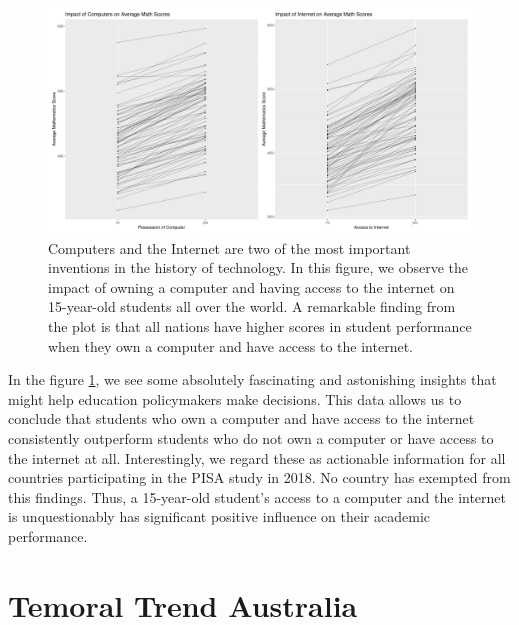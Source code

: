 \begin{Schunk}
\begin{figure}[H]
\includegraphics[width=1\linewidth]{learningtower_files/figure-latex/compint-plot-1} \caption[Computers and the Internet are two of the most important inventions in the history of technology]{Computers and the Internet are two of the most important inventions in the history of technology. In this figure, we observe the impact of owning a computer and having access to the internet on 15-year-old students all over the world. A remarkable finding from the plot is that all nations have higher scores in student performance when they own a computer and have access to the internet.}\label{fig:compint-plot}
\end{figure}
\end{Schunk}

In the figure \ref{fig:compint-plot}, we see some absolutely fascinating
and astonishing insights that might help education policymakers make
decisions. This data allows us to conclude that students who own a
computer and have access to the internet consistently outperform
students who do not own a computer or have access to the internet at
all. Interestingly, we regard these as actionable information for all
countries participating in the PISA study in 2018. No country has
exempted from this findings. Thus, a 15-year-old student's access to a
computer and the internet is unquestionably has significant positive
influence on their academic performance.

\hypertarget{temoral-trend-australia}{%
\section{Temoral Trend Australia}\label{temoral-trend-australia}}


